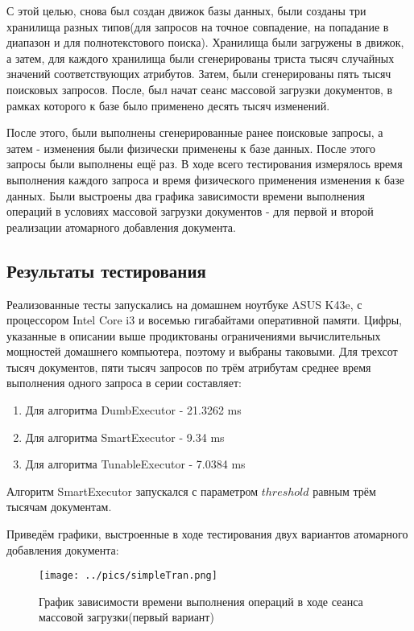 \documentclass{matmex-diploma}
\begin{document}
        С этой целью, снова был создан движок базы данных, были созданы три хранилища разных типов(для запросов на точное совпадение, на попадание в диапазон и для полнотекстового поиска). Хранилища были загружены в движок, а затем, для каждого хранилища были сгенерированы триста тысяч случайных значений соответствующих атрибутов. Затем, были сгенерированы пять тысяч поисковых запросов. После, был начат сеанс массовой загрузки документов, в рамках которого к базе было применено десять тысяч изменений.
        
        После этого, были выполнены сгенерированные ранее поисковые запросы, а затем - изменения были физически применены к базе данных. После этого запросы были выполнены ещё раз. В ходе всего тестирования измерялось время выполнения каждого запроса и время физического применения изменения к базе данных. Были выстроены два графика зависимости времени выполнения операций в условиях массовой загрузки документов - для первой и второй реализации атомарного добавления документа.
    \subsection{Результаты тестирования}
        Реализованные тесты запускались на домашнем ноутбуке ASUS K43e, с процессором Intel Core i3 и восемью гигабайтами оперативной памяти. Цифры, указанные в описании выше продиктованы ограничениями вычислительных мощностей домашнего компьютера, поэтому и выбраны таковыми.
        Для трехсот тысяч документов, пяти тысяч запросов по трём атрибутам среднее время выполнения одного запроса в серии составляет:
        \begin{enumerate}
            \item Для алгоритма DumbExecutor - 21.3262 ms
            \item Для алгоритма SmartExecutor - 9.34  ms
            \item Для алгоритма TunableExecutor - 7.0384 ms 
        \end{enumerate}
        
        Алгоритм SmartExecutor запускался с параметром $threshold$ равным трём тысячам документам.
        
        Приведём графики, выстроенные в ходе тестирования двух вариантов атомарного добавления документа:
        
        \begin{figure}[H]
            \centering
            \texttt{[image: ../pics/simpleTran.png]}
            \caption{График зависимости времени выполнения операций в ходе сеанса массовой загрузки(первый вариант)}
            \label{simpleTran}
        \end{figure}
        
\end{document}
